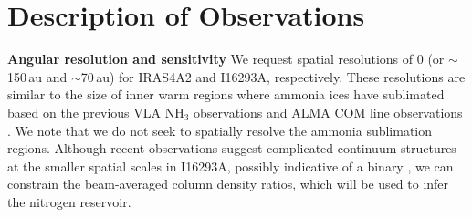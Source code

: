 \documentclass[12pt,a4paper]{article}  %
\begin{document}

%





\section{Description of Observations}\label{sec:desc_obs}

\noindent \textbf{Angular resolution and sensitivity} \quad We request spatial resolutions of 0 (or $\sim$150\,au and $\sim$70\,au) for IRAS4A2 and I16293A, respectively. These resolutions are similar to the size of inner warm regions where ammonia ices have sublimated based on the previous VLA NH$_3$ observations \citep[][, articale in preparation]{Choi10} and ALMA COM line observations \citep{Manigand20}. We note that we do not seek to spatially resolve the ammonia sublimation regions. Although recent observations suggest complicated continuum structures at the smaller spatial scales in I16293A, possibly indicative of a binary \citep{Maureira20}, we can constrain the beam-averaged column density ratios, which will be used to infer the nitrogen reservoir.
\end{document}
